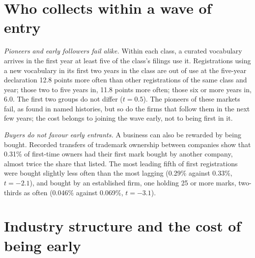 \section{Who collects within a wave of entry}\label{sec:collect}

\emph{Pioneers and early followers fail alike.} Within each class, a
curated vocabulary arrives in the first year at least five of the class's
filings use it. Registrations using a new vocabulary in its first two
years in the class are out of use at the five-year declaration 12.8
points more often than other registrations of the same class and year;
those two to five years in, 11.8 points more often; those six or more
years in, 6.0. The first two groups do not differ ($t = 0.5$). The
pioneers of these markets fail, as \citet{GolderTellis1993} found in
named histories, but so do the firms that follow them in the next few
years; the cost belongs to joining the wave early, not to being first in
it.

\emph{Buyers do not favour early entrants.} A business can also be
rewarded by being bought. Recorded transfers of trademark ownership
between companies show that 0.31\% of first-time owners had their first
mark bought by another company, almost twice the share that listed. The
most leading fifth of first registrations were bought slightly less often
than the most lagging (0.29\% against 0.33\%, $t = -2.1$), and bought by
an established firm, one holding 25 or more marks, two-thirds as often
(0.046\% against 0.069\%, $t = -3.1$).


\section{Industry structure and the cost of being early}\label{sec:structure}


